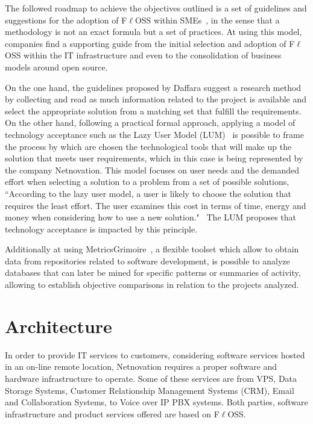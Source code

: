 \documentclass[a4paper, 12pt]{book}
\begin{document}
The followed roadmap to achieve the objectives outlined is a set of guidelines and suggestions for the adoption of F$\ell$OSS within SMEs~\cite{Daffara1}, in the sense that a methodology is not an exact formula but a set of practices. At using this model, companies find a supporting guide from the initial selection and adoption of F$\ell$OSS within the IT infrastructure and even to the consolidation of business models around open source.\bigskip

\noindent On the one hand, the guidelines proposed by Daffara suggest a research method by collecting and read as much information related to the project is available and select the appropriate solution from a matching set that fulfill the requirements. On the other hand, following a practical formal approach, applying a model of technology acceptance such as the Lazy User Model (LUM)~\cite{CandT1} is possible to frame the process by which are chosen the technological tools that will make up the solution that meets user requirements, which in this case is being represented by the company Netnovation. This model focuses on user needs and the demanded effort when selecting a solution to a problem from a set of possible solutions, ``According to the lazy user model, a user is likely to choose the solution that requires the least effort. The user examines this cost in terms of time, energy and money when considering how to use a new solution."~\cite{CandT2} The LUM proposes that technology acceptance is impacted 
by this principle.\bigskip

\noindent Additionally at using MetricsGrimoire~\cite{GSyC}, a flexible toolset which allow to obtain data from repositories related to software development, is possible to analyze databases that can later be mined for specific patterns or summaries of activity, allowing to establish objective comparisons in relation to the projects analyzed.


%
\chapter{Architecture}
\label{chap:architecture}

In order to provide IT services to customers, considering software services hosted in an on-line remote location, Netnovation requires a proper software and hardware infrastructure to operate. Some of these services are from VPS, Data Storage Systems, Customer Relationship Management Systems (CRM), Email and Collaboration Systems, to Voice over IP PBX systems. Both parties, software infrastructure and product services offered are based on F$\ell$OSS.\bigskip
\end{document}
